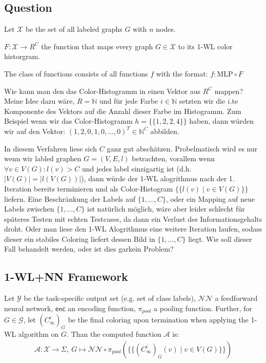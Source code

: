\documentclass[11pt, dvipsnames, DIV=12]{scrreprt}
\theoremstyle{definition}
\newcommand{\MSopen}{\{\!\!\{}
\newcommand{\MSclose}{\}\!\!\}}
\newcommand{\wlnn}{\text{1-WL+NN }}
\begin{document}
\subsection{Question}
Let $\mathcal{X}$ be the set of all labeled graphs $G$ with $n$ nodes.

\noindent $F: \mathcal{X} \rightarrow R^C$ the function that maps every graph $G \in \mathcal{X}$ to its 1-WL color historgram.

\noindent The class \wlnn of functions consists of all functions $f$ with the format: $f: \text{MLP} \circ F$\newline

Wie kann man den das Color-Histogramm in einen Vektor aus $R^C$ mappen?\\
Meine Idee dazu wäre, $R = \mathbb{N}$ und für jede Farbe $i \in \mathbb{N}$ setzten wir die $i$.te Komponente des Vektors auf die Anzahl dieser Farbe im Histogramm. Zum Beispiel wenn wir das Color-Histogramm $h = \MSopen 1, 2, 2, 4\MSclose$ haben, dann würden wir auf den Vektor: $(1, 2, 0, 1, 0, \dots, 0)^T \in \mathbb{N}^C$ abbilden.\newline

In diesem Verfahren liese sich $C$ ganz gut abschätzen. Probelmatisch wird es nur wenn wir labled graphen $G = (V, E, l)$ betrachten, vorallem wenn $\forall v \in V(G): l(v) > C$ und jedes label einzigartig ist (d.h. $|V(G)| = |l(V(G))|$), dann würde der 1-WL alogrithmus nach der 1. Iteration bereits terminieren und als Color-Histogram $\MSopen l(v) \mid v \in V(G) \MSclose$ liefern. Eine Beschränkung der Labels auf $\{1, \dots, C\}$, oder ein Mapping auf neue Labels zwischen $\{1, \dots, C\}$ ist natürlich möglich, wäre aber leider schlecht für späteres Testen mit echten Testcases, da dann ein Verlust des Informationsgehalts droht. Oder man liese den 1-WL Alogrithmus eine weitere Iteration laufen, sodass dieser ein stabiles Coloring liefert dessen Bild in $\{1, \dots, C\}$ liegt. Wie soll dieser Fall behandelt werden, oder ist dies garkein Problem?





\subsection{1-WL+NN Framework}
Let $\mathcal{Y}$ be the task-specific output set (e.g. set of class labels), $\mathcal{NN}$ a feedforward neural network, $\textsf{enc}$ an encoding function, $\pi_{pool}$ a pooling function. Further, for $G \in \mathcal{G}$, let $(C^i_\infty)_{G}$ be the final coloring upon termination when applying the 1-WL algorithm on $G$. Than the computed function $\mathcal{A}$ is:
\begin{align}
\mathcal{A}: \mathcal{X} \rightarrow \Sigma, \  G \mapsto \mathcal{NN} \circ \pi_{pool}(\MSopen (C^i_\infty)_{G}(v) \mid v \in V(G) \MSclose)
\end{align}
\end{document}
